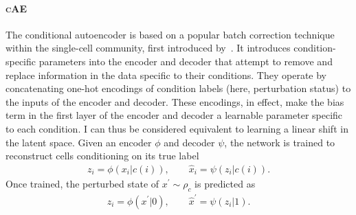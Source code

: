 \paragraph{\textsc{cAE}}
The conditional autoencoder is based on a popular batch correction technique within the single-cell community, first introduced by~\citep{lopez2018}.
It introduces condition-specific parameters into the encoder and decoder that attempt to remove and replace information in the data specific to their conditions.
They operate by concatenating one-hot encodings of condition labels (here, perturbation status) to the inputs of the encoder and decoder.
These encodings, in effect, make the bias term in the first layer of the encoder and decoder a learnable parameter specific to each condition. I can thus be considered equivalent to learning a linear shift in the latent space.
Given an encoder $\phi$ and decoder $\psi$, the network is trained to reconstruct cells conditioning on its true label
\begin{align*}
    z_i = \phi( x_i | c(i)), \quad \quad \hat{x}_i = \psi(z_i | c(i)).
\end{align*}
Once trained, the perturbed state of $x^\prime \sim \rho_c$ is predicted as
\begin{align*}
        z_i = \phi( x^\prime | 0), \quad \quad \hat{x}^\prime = \psi(z_i | 1).
\end{align*}
